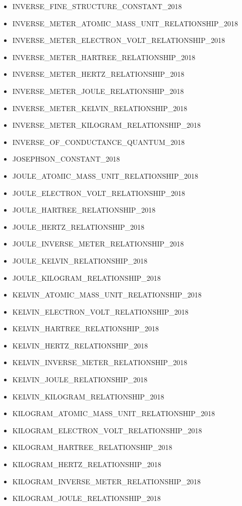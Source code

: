 \begin{itemize}
\item INVERSE\_FINE\_STRUCTURE\_CONSTANT\_2018
\item INVERSE\_METER\_ATOMIC\_MASS\_UNIT\_RELATIONSHIP\_2018
\item INVERSE\_METER\_ELECTRON\_VOLT\_RELATIONSHIP\_2018
\item INVERSE\_METER\_HARTREE\_RELATIONSHIP\_2018
\item INVERSE\_METER\_HERTZ\_RELATIONSHIP\_2018
\item INVERSE\_METER\_JOULE\_RELATIONSHIP\_2018
\item INVERSE\_METER\_KELVIN\_RELATIONSHIP\_2018
\item INVERSE\_METER\_KILOGRAM\_RELATIONSHIP\_2018
\item INVERSE\_OF\_CONDUCTANCE\_QUANTUM\_2018
\item JOSEPHSON\_CONSTANT\_2018
\item JOULE\_ATOMIC\_MASS\_UNIT\_RELATIONSHIP\_2018
\item JOULE\_ELECTRON\_VOLT\_RELATIONSHIP\_2018
\item JOULE\_HARTREE\_RELATIONSHIP\_2018
\item JOULE\_HERTZ\_RELATIONSHIP\_2018
\item JOULE\_INVERSE\_METER\_RELATIONSHIP\_2018
\item JOULE\_KELVIN\_RELATIONSHIP\_2018
\item JOULE\_KILOGRAM\_RELATIONSHIP\_2018
\item KELVIN\_ATOMIC\_MASS\_UNIT\_RELATIONSHIP\_2018
\item KELVIN\_ELECTRON\_VOLT\_RELATIONSHIP\_2018
\item KELVIN\_HARTREE\_RELATIONSHIP\_2018
\item KELVIN\_HERTZ\_RELATIONSHIP\_2018
\item KELVIN\_INVERSE\_METER\_RELATIONSHIP\_2018
\item KELVIN\_JOULE\_RELATIONSHIP\_2018
\item KELVIN\_KILOGRAM\_RELATIONSHIP\_2018
\item KILOGRAM\_ATOMIC\_MASS\_UNIT\_RELATIONSHIP\_2018
\item KILOGRAM\_ELECTRON\_VOLT\_RELATIONSHIP\_2018
\item KILOGRAM\_HARTREE\_RELATIONSHIP\_2018
\item KILOGRAM\_HERTZ\_RELATIONSHIP\_2018
\item KILOGRAM\_INVERSE\_METER\_RELATIONSHIP\_2018
\item KILOGRAM\_JOULE\_RELATIONSHIP\_2018

\end{itemize}
